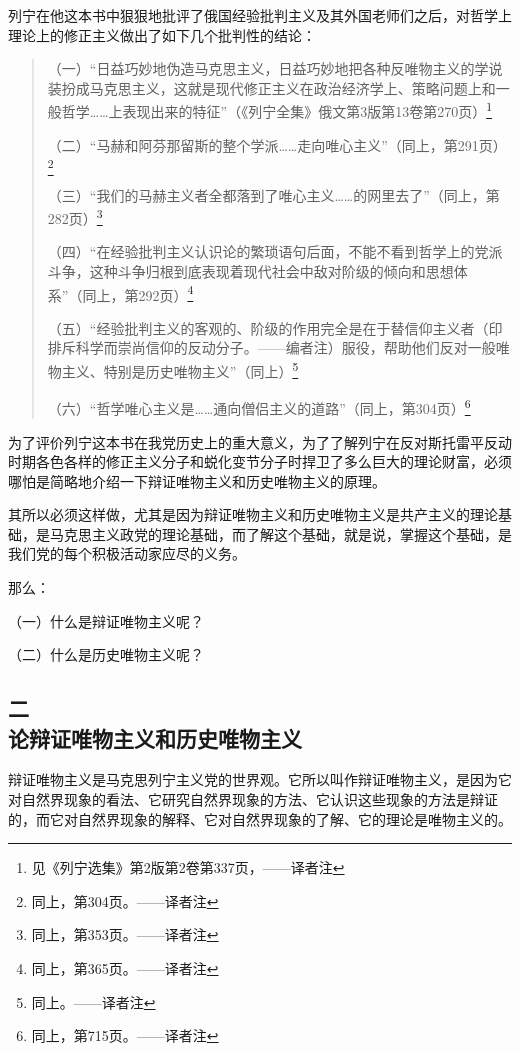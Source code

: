 列宁在他这本书中狠狠地批评了俄国经验批判主义及其外国老师们之后，对哲学上理论上的修正主义做出了如下几个批判性的结论：

\begin{quotation}
（一）“日益巧妙地伪造马克思主义，日益巧妙地把各种反唯物主义的学说装扮成马克思主义，这就是现代修正主义在政治经济学上、策略问题上和一般哲学……上表现出来的特征”（《列宁全集》俄文第3版第13卷第270页）\footnote{见《列宁选集》第2版第2卷第337页，——译者注}

（二）“马赫和阿芬那留斯的整个学派……走向唯心主义”（同上，第291页）\footnote{同上，第304页。——译者注}

（三）“我们的马赫主义者全都落到了唯心主义……的网里去了”（同上，第282页）\footnote{同上，第353页。——译者注}

（四）“在经验批判主义认识论的繁琐语句后面，不能不看到哲学上的党派斗争，这种斗争归根到底表现着现代社会中敌对阶级的倾向和思想体系”（同上，第292页）\footnote{同上，第365页。——译者注}

（五）“经验批判主义的客观的、阶级的作用完全是在于替信仰主义者（印排斥科学而崇尚信仰的反动分子。——编者注）服役，帮助他们反对一般唯物主义、特别是历史唯物主义”（同上）\footnote{同上。——译者注}

（六）“哲学唯心主义是……通向僧侣主义的道路”（同上，第304页）\footnote{同上，第715页。——译者注}
\end{quotation}

为了评价列宁这本书在我党历史上的重大意义，为了了解列宁在反对斯托雷平反动时期各色各样的修正主义分子和蜕化变节分子时捍卫了多么巨大的理论财富，必须哪怕是简略地介绍一下辩证唯物主义和历史唯物主义的原理。

其所以必须这样做，尤其是因为辩证唯物主义和历史唯物主义是共产主义的理论基础，是马克思主义政党的理论基础，而了解这个基础，就是说，掌握这个基础，是我们党的每个积极活动家应尽的义务。

那么：

（一）什么是辩证唯物主义呢？

（二）什么是历史唯物主义呢？


\subsection[二\q 论辩证唯物主义和历史唯物主义]{二\\ 论辩证唯物主义和历史唯物主义}

辩证唯物主义是马克思列宁主义党的世界观。它所以叫作辩证唯物主义，是因为它对自然界现象的看法、它研究自然界现象的方法、它认识这些现象的方法是辩证的，而它对自然界现象的解释、它对自然界现象的了解、它的理论是唯物主义的。

